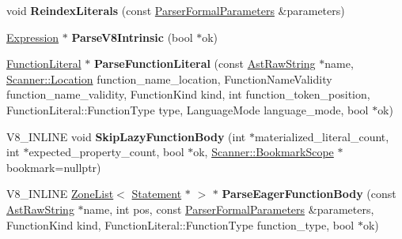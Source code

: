 \begin{DoxyCompactItemize}
\item 
void {\bfseries Reindex\+Literals} (const \hyperlink{structv8_1_1internal_1_1_parser_formal_parameters}{Parser\+Formal\+Parameters} \&parameters)\hypertarget{classv8_1_1internal_1_1_parser_traits_a83b75075c504b64b3bb9a604e186d8e0}{}\label{classv8_1_1internal_1_1_parser_traits_a83b75075c504b64b3bb9a604e186d8e0}

\item 
\hyperlink{classv8_1_1internal_1_1_expression}{Expression} $\ast$ {\bfseries Parse\+V8\+Intrinsic} (bool $\ast$ok)\hypertarget{classv8_1_1internal_1_1_parser_traits_a4c1035a3d38d18d607affbac41dc5a42}{}\label{classv8_1_1internal_1_1_parser_traits_a4c1035a3d38d18d607affbac41dc5a42}

\item 
\hyperlink{classv8_1_1internal_1_1_function_literal}{Function\+Literal} $\ast$ {\bfseries Parse\+Function\+Literal} (const \hyperlink{classv8_1_1internal_1_1_ast_raw_string}{Ast\+Raw\+String} $\ast$name, \hyperlink{structv8_1_1internal_1_1_scanner_1_1_location}{Scanner\+::\+Location} function\+\_\+name\+\_\+location, Function\+Name\+Validity function\+\_\+name\+\_\+validity, Function\+Kind kind, int function\+\_\+token\+\_\+position, Function\+Literal\+::\+Function\+Type type, Language\+Mode language\+\_\+mode, bool $\ast$ok)\hypertarget{classv8_1_1internal_1_1_parser_traits_adb39443ce2eb36346ca195869ec02b02}{}\label{classv8_1_1internal_1_1_parser_traits_adb39443ce2eb36346ca195869ec02b02}

\item 
V8\+\_\+\+I\+N\+L\+I\+NE void {\bfseries Skip\+Lazy\+Function\+Body} (int $\ast$materialized\+\_\+literal\+\_\+count, int $\ast$expected\+\_\+property\+\_\+count, bool $\ast$ok, \hyperlink{classv8_1_1internal_1_1_scanner_1_1_bookmark_scope}{Scanner\+::\+Bookmark\+Scope} $\ast$bookmark=nullptr)\hypertarget{classv8_1_1internal_1_1_parser_traits_aaaf536f29e16935387fbffc33c0adf65}{}\label{classv8_1_1internal_1_1_parser_traits_aaaf536f29e16935387fbffc33c0adf65}

\item 
V8\+\_\+\+I\+N\+L\+I\+NE \hyperlink{classv8_1_1internal_1_1_zone_list}{Zone\+List}$<$ \hyperlink{classv8_1_1internal_1_1_statement}{Statement} $\ast$ $>$ $\ast$ {\bfseries Parse\+Eager\+Function\+Body} (const \hyperlink{classv8_1_1internal_1_1_ast_raw_string}{Ast\+Raw\+String} $\ast$name, int pos, const \hyperlink{structv8_1_1internal_1_1_parser_formal_parameters}{Parser\+Formal\+Parameters} \&parameters, Function\+Kind kind, Function\+Literal\+::\+Function\+Type function\+\_\+type, bool $\ast$ok)\hypertarget{classv8_1_1internal_1_1_parser_traits_a7590529a733225c5999cc0f88c2465df}{}\label{classv8_1_1internal_1_1_parser_traits_a7590529a733225c5999cc0f88c2465df}


\end{DoxyCompactItemize}
